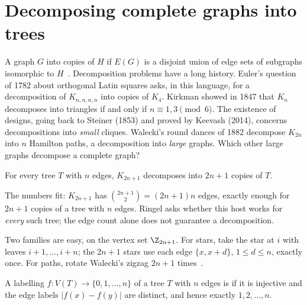 \section{Decomposing complete graphs into trees}\label{sec:decompositions}

A graph $G$  into copies of $H$ if $E(G)$ is a disjoint union of edge sets of subgraphs isomorphic to $H$~\cite[\S1]{mps20}. Decomposition problems have a long history. Euler's question of 1782 about orthogonal Latin squares asks, in this language, for a decomposition of $K_{n,n,n,n}$ into copies of $K_4$. Kirkman showed in 1847 that $K_n$ decomposes into triangles if and only if $n\equiv1,3\pmod6$. The existence of designs, going back to Steiner (1853) and proved by Keevash (2014), concerns decompositions into \emph{small} cliques. Walecki's round dances of 1882 decompose $K_{2n}$ into $n$ Hamilton paths, a decomposition into \emph{large} graphs. Which other large graphs decompose a complete graph?


\begin{conjecture}\label{conj:ringel}
For every tree $T$ with $n$ edges, $K_{2n+1}$ decomposes into $2n+1$ copies of $T$.
\end{conjecture}

The numbers fit: $K_{2n+1}$ has $\binom{2n+1}{2}=(2n+1)n$ edges, exactly enough for $2n+1$ copies of a tree with $n$ edges. Ringel asks whether this host works for \emph{every} such tree; the edge count alone does not guarantee a decomposition.

\begin{example}\label{ex:stars-paths}
Two families are easy, on the vertex set $\Z_{2n+1}$. For stars, take the star at $i$ with leaves $i+1,\dots,i+n$; the $2n+1$ stars use each edge $\{x,x+d\}$, $1\leq d\leq n$, exactly once. For paths, rotate Walecki's zigzag $2n+1$ times~\cite{luc1883}.
\end{example}


\begin{definition}\label{def:graceful}
A labelling $f\colon V(T)\to\{0,1,\dots,n\}$ of a tree $T$ with $n$ edges is  if it is injective and the edge labels $|f(x)-f(y)|$ are distinct, and hence exactly $1,2,\dots,n$.
\end{definition}

